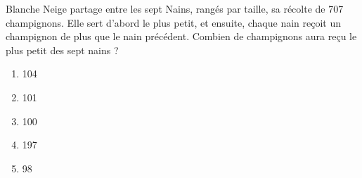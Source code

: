 Blanche Neige partage entre les sept Nains, rangés par taille, sa
récolte de 707 champignons. Elle sert d'abord le plus petit, et
ensuite, chaque nain reçoit un champignon de plus que le nain
précédent. Combien de champignons aura reçu le plus petit des sept
nains ?
\begin{multicols}{5}
  \begin{enumerate}[A/]
  \item 104
  \item 101
  \item 100
  \item 197
  \item 98
  \end{enumerate}
\end{multicols}